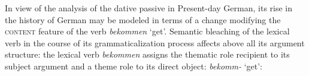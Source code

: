 \documentclass[output=paper
                ,modfonts
                ,nonflat
	        ,collection
	        ,collectionchapter
	        ,collectiontoclongg
 	        ,biblatex
                ,babelshorthands
                ,newtxmath
                ,draftmode
                ,colorlinks, citecolor=brown
]{./langsci/langscibook}
\begin{document}
In view of the analysis of the dative passive in Present-day German, its rise in the history of German may be modeled in terms of a change modifying the \textsc{content} feature of the verb \textit{bekommen} `get'. Semantic bleaching of the lexical verb in the course of its grammaticalization process affects above all its argument structure: the lexical verb \textit{bekommen} assigns the thematic role recipient to its subject argument and a theme role to its direct object: 
\ea \label{active_voll} 
\textit{bekomm-} `get': \\
\z 
\end{document}

